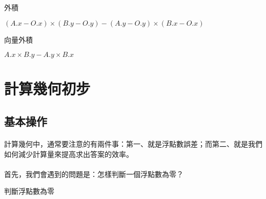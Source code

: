 \documentclass[12pt,a4paper,oneside]{report}
\begin{document}
\begin{CJK}{UTF8}{bkai}
\begin{algorithm}
\caption{外積}
\label{algo:cross_product}
\begin{algorithmic}
  \State \Return $(A.x-O.x)\times{(B.y-O.y)}-(A.y-O.y)\times{(B.x-O.x)}$
\EndProcedure
\end{algorithmic}
\end{algorithm}
\begin{algorithm}
\caption{向量外積}
\label{algo:cross_product_vector}
\begin{algorithmic}
  \State \Return $A.x\times{B.y}-A.y\times{B.x}$
\EndProcedure
\end{algorithmic}
\end{algorithm}

\section{計算幾何初步}

\subsection{基本操作}
\paragraph{}計算幾何中，通常要注意的有兩件事：第一、就是浮點數誤差；而第二、就是我們如何減少計算量來提高求出答案的效率。
\paragraph{}首先，我們會遇到的問題是：怎樣判斷一個浮點數為零？

\begin{algorithm}
\caption{判斷浮點數為零}
\begin{algorithmic}
    \State \Return \True
  \Else
    \State \Return \False
  \EndIf
\EndProcedure
\end{algorithmic}
\end{algorithm}

\ifx \allfiles \undefined
\printindex[noun]

\clearpage
\end{CJK}
\end{document}
